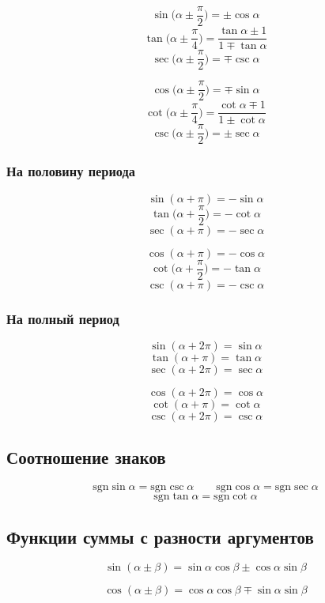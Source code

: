 \documentclass[
  letterpaper,
]{scrbook}
\newcommand{\sgn}{\mathrm{sgn}}
\theoremstyle{definition}
\theoremstyle{remark}
\begin{document}
\[\sin \Big(\alpha \pm \frac{\pi}{2}\Big) = \pm\cos \alpha\]
\[\tan \Big(\alpha \pm \frac{\pi}{4}\Big) = \frac{\tan \alpha \pm 1}{1 \mp \tan \alpha}\]
\[\sec \Big(\alpha \pm \frac{\pi}{2}\Big) = \mp \csc \alpha\]

\[\cos \Big(\alpha \pm \frac{\pi}{2}\Big) = \mp \sin \alpha\]
\[\cot \Big(\alpha \pm \frac{\pi}{4}\Big) = \frac{\cot \alpha \mp 1}{1 \pm \cot \alpha}\]
\[\csc \Big(\alpha \pm \frac{\pi}{2}\Big) = \pm \sec \alpha\]

\subsubsection{На половину периода}\label{trig_shift_by_half}

\[\sin (\alpha + \pi) = -\sin \alpha\]
\[\tan \Big(\alpha + \frac{\pi}{2}\Big) = -\cot \alpha\]
\[\sec (\alpha + \pi) = -\sec \alpha\]

\[\cos (\alpha + \pi) = -\cos \alpha\]
\[\cot \Big(\alpha + \frac{\pi}{2}\Big) = -\tan \alpha\]
\[\csc (\alpha + \pi) = -\csc \alpha\]

\subsubsection{На полный период}\label{trig_shift_by_full}

\[\sin (\alpha + 2\pi) = \sin \alpha\]
\[\tan (\alpha + \pi) = \tan \alpha\]
\[\sec (\alpha + 2\pi) = \sec \alpha\]

\[\cos (\alpha + 2\pi) = \cos \alpha\]
\[\cot (\alpha + \pi) = \cot \alpha\]
\[\csc (\alpha + 2\pi) = \csc \alpha\]

\subsection{Соотношение знаков}\label{trig_sgn}

\[
\sgn \sin \alpha = \sgn \csc \alpha \qquad \sgn \cos \alpha = \sgn \sec \alpha
\] \[
\sgn \tan \alpha = \sgn \cot \alpha
\]

\subsection{Функции суммы с разности аргументов}\label{trig_angle_sum}

\[
\sin (\alpha \pm \beta) = \sin \alpha \cos \beta \pm \cos \alpha \sin \beta
\]

\[
\cos (\alpha \pm \beta) = \cos \alpha \cos \beta \mp \sin \alpha \sin \beta
\]
\end{document}
